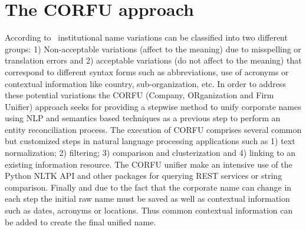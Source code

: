 \documentclass{llncs}
\begin{document}
\begin{itemize}
  
% 
% 
% 
%  
%  
\end{itemize}

 \section{The CORFU approach}
According to~\cite{Galvez2006,Morillo:2013:TAA:2424697.2424727} institutional name variations can be 
classified into two different groups: 1) Non-acceptable variations (affect to the meaning) due to misspelling or translation errors and 
2) acceptable variations (do not affect to the meaning) that correspond to different syntax forms such as abbreviations, use of acronyms or contextual 
information like country, sub-organization, etc. In order to address these potential variations the CORFU (Company, ORganization and Firm Unifier) approach 
seeks for providing a stepwise method to unify corporate names using NLP and semantics based techniques as a previous step to perform 
an entity reconciliation process. The execution of CORFU comprises several common but customized steps in natural language processing applications such as 
1) text normalization; 2) filtering; 3) comparison and clusterization and 4) linking to an existing information resource. The CORFU unifier 
make an intensive use of the Python NLTK API and other packages for querying REST services or string comparison. Finally and 
due to the fact that the corporate name can change in each step the initial raw name must be saved as well as contextual information such as dates, acronyms or locations. 
Thus common contextual information can be added to create the final unified name.
\end{document}
